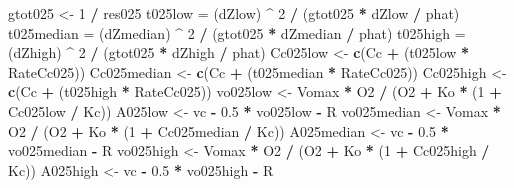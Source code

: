 \documentclass[
]{krantz}
\makeatletter
\newenvironment{Shaded}{\begin{snugshade}}{\end{snugshade}}
\newcommand{\DecValTok}[1]{\textcolor[rgb]{0.00,0.00,0.81}{#1}}
\newcommand{\FloatTok}[1]{\textcolor[rgb]{0.00,0.00,0.81}{#1}}
\newcommand{\KeywordTok}[1]{\textcolor[rgb]{0.13,0.29,0.53}{\textbf{#1}}}
\newcommand{\NormalTok}[1]{#1}
\newcommand{\OperatorTok}[1]{\textcolor[rgb]{0.81,0.36,0.00}{\textbf{#1}}}
\newcommand{\StringTok}[1]{\textcolor[rgb]{0.31,0.60,0.02}{#1}}
\newenvironment{kframe}{%
\medskip{}
\setlength{\fboxsep}{.8em}
 \def\at@end@of@kframe{}%
 \ifinner\ifhmode%
  \def\at@end@of@kframe{\end{minipage}}%
  \begin{minipage}{\columnwidth}%
 \fi\fi%
 \def\FrameCommand##1{\hskip\@totalleftmargin \hskip-\fboxsep
 \colorbox{shadecolor}{##1}\hskip-\fboxsep
     \hskip-\linewidth \hskip-\@totalleftmargin \hskip\columnwidth}%
 \MakeFramed {\advance\hsize-\width
   \@totalleftmargin\z@ \linewidth\hsize
   \@setminipage}}%
 {\par\unskip\endMakeFramed%
 \at@end@of@kframe}
\renewenvironment{Shaded}{\begin{kframe}}{\end{kframe}}
\makeatother
\begin{document}
\begin{Shaded}
\begin{Highlighting}[]
\NormalTok{gtot025 \textless{}{-}}\StringTok{ }\DecValTok{1} \OperatorTok{/}\StringTok{ }\NormalTok{res025}
\NormalTok{t025low =}\StringTok{ }\NormalTok{(dZlow) }\OperatorTok{\^{}}\StringTok{ }\DecValTok{2} \OperatorTok{/}\StringTok{ }\NormalTok{(gtot025 }\OperatorTok{*}\StringTok{ }\NormalTok{dZlow }\OperatorTok{/}\StringTok{ }\NormalTok{phat)}
\NormalTok{t025median =}\StringTok{ }\NormalTok{(dZmedian) }\OperatorTok{\^{}}\StringTok{ }\DecValTok{2} \OperatorTok{/}\StringTok{ }\NormalTok{(gtot025 }\OperatorTok{*}\StringTok{ }\NormalTok{dZmedian }\OperatorTok{/}\StringTok{ }\NormalTok{phat)}
\NormalTok{t025high =}\StringTok{ }\NormalTok{(dZhigh) }\OperatorTok{\^{}}\StringTok{ }\DecValTok{2} \OperatorTok{/}\StringTok{ }\NormalTok{(gtot025 }\OperatorTok{*}\StringTok{ }\NormalTok{dZhigh }\OperatorTok{/}\StringTok{ }\NormalTok{phat)}
\NormalTok{Cc025low \textless{}{-}}\StringTok{ }\KeywordTok{c}\NormalTok{(Cc }\OperatorTok{+}\StringTok{ }\NormalTok{(t025low }\OperatorTok{*}\StringTok{ }\NormalTok{RateCc025))}
\NormalTok{Cc025median \textless{}{-}}\StringTok{ }\KeywordTok{c}\NormalTok{(Cc }\OperatorTok{+}\StringTok{ }\NormalTok{(t025median }\OperatorTok{*}\StringTok{ }\NormalTok{RateCc025))}
\NormalTok{Cc025high \textless{}{-}}\StringTok{ }\KeywordTok{c}\NormalTok{(Cc }\OperatorTok{+}\StringTok{ }\NormalTok{(t025high }\OperatorTok{*}\StringTok{ }\NormalTok{RateCc025))}
\NormalTok{vo025low \textless{}{-}}\StringTok{ }\NormalTok{Vomax }\OperatorTok{*}\StringTok{ }\NormalTok{O2 }\OperatorTok{/}\StringTok{ }\NormalTok{(O2 }\OperatorTok{+}\StringTok{ }\NormalTok{Ko }\OperatorTok{*}\StringTok{ }\NormalTok{(}\DecValTok{1} \OperatorTok{+}\StringTok{ }\NormalTok{Cc025low }\OperatorTok{/}\StringTok{ }\NormalTok{Kc)) }
\NormalTok{A025low \textless{}{-}}\StringTok{ }\NormalTok{vc }\OperatorTok{{-}}\StringTok{ }\FloatTok{0.5} \OperatorTok{*}\StringTok{ }\NormalTok{vo025low }\OperatorTok{{-}}\StringTok{ }\NormalTok{R }
\NormalTok{vo025median \textless{}{-}}\StringTok{ }\NormalTok{Vomax }\OperatorTok{*}\StringTok{ }\NormalTok{O2 }\OperatorTok{/}\StringTok{ }\NormalTok{(O2 }\OperatorTok{+}\StringTok{ }\NormalTok{Ko }\OperatorTok{*}\StringTok{ }\NormalTok{(}\DecValTok{1} \OperatorTok{+}\StringTok{ }\NormalTok{Cc025median }\OperatorTok{/}\StringTok{ }\NormalTok{Kc)) }
\NormalTok{A025median \textless{}{-}}\StringTok{ }\NormalTok{vc }\OperatorTok{{-}}\StringTok{ }\FloatTok{0.5} \OperatorTok{*}\StringTok{ }\NormalTok{vo025median }\OperatorTok{{-}}\StringTok{ }\NormalTok{R }
\NormalTok{vo025high \textless{}{-}}\StringTok{ }\NormalTok{Vomax }\OperatorTok{*}\StringTok{ }\NormalTok{O2 }\OperatorTok{/}\StringTok{ }\NormalTok{(O2 }\OperatorTok{+}\StringTok{ }\NormalTok{Ko }\OperatorTok{*}\StringTok{ }\NormalTok{(}\DecValTok{1} \OperatorTok{+}\StringTok{ }\NormalTok{Cc025high }\OperatorTok{/}\StringTok{ }\NormalTok{Kc)) }
\NormalTok{A025high \textless{}{-}}\StringTok{ }\NormalTok{vc }\OperatorTok{{-}}\StringTok{ }\FloatTok{0.5} \OperatorTok{*}\StringTok{ }\NormalTok{vo025high }\OperatorTok{{-}}\StringTok{ }\NormalTok{R }


\end{Highlighting}
\end{Shaded}
\end{document}
